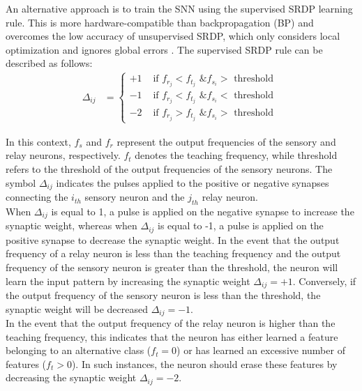 \noindent An alternative approach is to train the SNN using the supervised SRDP learning rule. This is more hardware-compatible than backpropagation (BP) and overcomes the low accuracy of unsupervised SRDP, which only considers local optimization and ignores global errors \cite{pfeiffer2018deep}. The supervised SRDP rule can be described as follows:
\begin{align}
\Delta_{ij} &= \begin{cases}
+1 & \text{ if } f_{r_j} < f_{t_j} \text{ \& } f_{s_i} > \text{ threshold }\\ 
-1 & \text{ if } f_{r_j} < f_{t_j} \text{ \& } f_{s_i} < \text{ threshold } \\
-2 & \text{ if } f_{r_j} > f_{t_j} \text{ \& } f_{s_i} > \text{ threshold }
\end{cases} \label{eq:6.15}
\end{align}

\noindent In this context, $f_s$ and $f_r$ represent the output frequencies of the sensory and relay neurons, respectively. $f_t$ denotes the teaching frequency, while threshold refers to the threshold of the output frequencies of the sensory neurons. The symbol $\Delta_{ij}$ indicates the pulses applied to the positive or negative synapses connecting the $i_{th}$ sensory neuron and the $j_{th}$ relay neuron. \\

\noindent When $\Delta_{ij}$ is equal to 1, a pulse is applied on the negative synapse to increase the synaptic weight, whereas when $\Delta_{ij}$ is equal to -1, a pulse is applied on the positive synapse to decrease the synaptic weight. In the event that the output frequency of a relay neuron is less than the teaching frequency and the output frequency of the sensory neuron is greater than the threshold, the neuron will learn the input pattern by increasing the synaptic weight $\Delta_{ij} = +1$. Conversely, if the output frequency of the sensory neuron is less than the threshold, the synaptic weight will be decreased $\Delta_{ij} = -1$. \\

\noindent In the event that the output frequency of the relay neuron is higher than the teaching frequency, this indicates that the neuron has either learned a feature belonging to an alternative class ($f_t = 0$) or has learned an excessive number of features ($f_t > 0$). In such instances, the neuron should erase these features by decreasing the synaptic weight $\Delta_{ij} = -2$.\\

